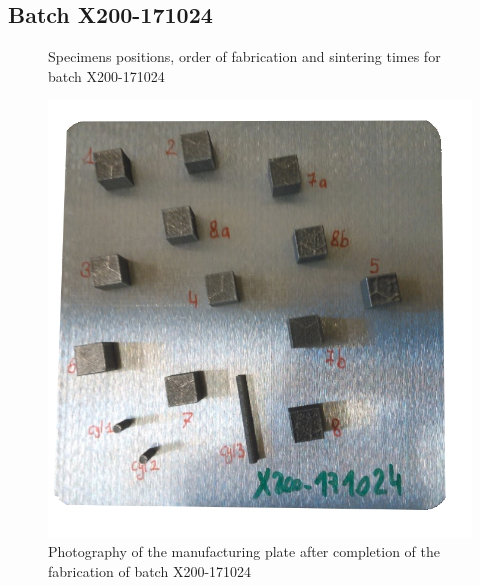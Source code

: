 \subsection{Batch X200-171024}

\begin{figure}[h!]
\centering
\noindent{}
\decoRule
\caption[Specimens positions, order of fabrication and sintering times for batch X200-171024]{Specimens positions, order of fabrication and sintering times for batch X200-171024}
\label{fig:171024-cad}
\end{figure}

\begin{figure}[h!]
\centering
\includegraphics[scale=0.42]{Images/171024-real}
\decoRule
\caption[Photography of the manufacturing plate after completion of the fabrication of batch X200-171024]{Photography of the manufacturing plate after completion of the fabrication of batch X200-171024}
\label{fig:171024-real}
\end{figure}

